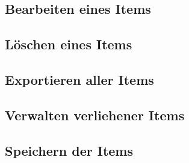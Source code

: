 \subsection{Bearbeiten eines Items}

\subsection{Löschen eines Items}

\subsection{Exportieren aller Items}

\subsection{Verwalten verliehener Items}

\subsection{Speichern der Items} 